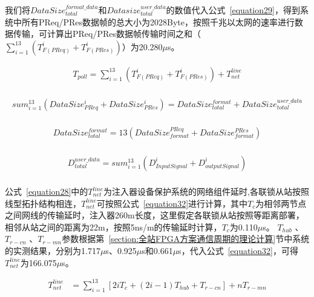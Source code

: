 我们将$DataSize_{total}^{format\_data}$和$Datasize_{total}^{user\_data}$的数值代入公式~\ref{equation29}，得到系统中所有PReq/PRes数据帧的总大小为2028Byte，按照千兆以太网的速率进行数据传输，可计算出PReq/PRes数据帧传输时间之和（$\sum_{i=1}^{13}(T_{F(PReq)}^{i}+T_{F(PRes)}^{i})$）为20.280$\mu$s。

\begin{equation}
\begin{split}
\label{equation28}
T_{poll}=\sum_{i=1}^{13}(T_{F(PReq)}^{i}+T_{F(PRes)}^{i})+T_{net}^{line}\\
\end{split}
\end{equation}

\begin{equation}
\begin{split}
\label{equation29}
sum_{i=1}^{13}(DataSize_{PReq}^{i}+DataSize_{PRes}^{i}) = DataSize_{total}^{format}+DataSize_{total}^{user\_data}\\
\end{split}
\end{equation}


\begin{equation}
\begin{split}
\label{equation30}
DataSize_{total}^{format} = 13(DataSize_{format}^{PReq}+DataSize_{format}^{PRes})\\
\end{split}
\end{equation}


\begin{equation}
\begin{split}
\label{equation31}
D_{total}^{user\_data} = sum_{i=1}^{13}(D_{InputSignal}^{i}+D_{outputSignal}^{i})\\
\end{split}
\end{equation}


公式~\ref{equation28}中的$T_{net}^{line}$为注入器设备保护系统的网络组件延时,各联锁从站按照线型拓扑结构相连，$T_{net}^{line}$可按照公式~\ref{equation32}进行计算，其中$T_{c}$为相邻两节点之间网线的传输延时，注入器260m长度，这里假定各联锁从站按照等距离部署，相邻从站之间的距离为22m，按照5ns/m的传输延时计算，$T_{c}$为0.110$\mu$s。 $T_{hub}$ 、$T_{r-cn}$ 、$T_{r-mn}$参数根据第~\ref{section:全站FPGA方案通信周期的理论计算}节中系统的实测结果，分别为1.717$\mu$s、0.925$\mu$s和0.661$\mu$s，代入公式~\ref{equation32}，可得$T_{net}^{line}$为166.075$\mu$s。

\begin{equation}
\begin{split}
\label{equation32}
T_{net}^{line}&=\sum_{i=1}^{13}[2iT_{c}+(2i-1)T_{hub}+T_{r-cn}]+nT_{r-mn}\\
\end{split}
\end{equation}

